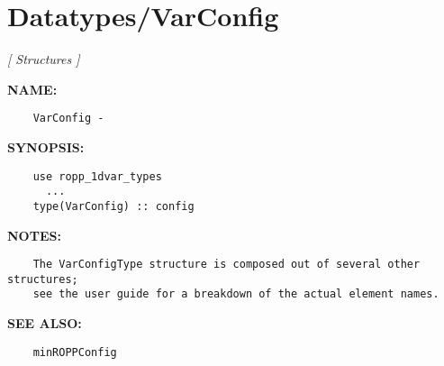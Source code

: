 \section{Datatypes/VarConfig}
\textsl{[ Structures ]}

\label{ch:robo9}
\label{ch:Datatypes_VarConfig}
\textbf{NAME:}\hspace{0.08in}\begin{Verbatim}
    VarConfig - 
\end{Verbatim}
\textbf{SYNOPSIS:}\hspace{0.08in}\begin{Verbatim}
    use ropp_1dvar_types
      ...
    type(VarConfig) :: config
\end{Verbatim}
\textbf{NOTES:}\hspace{0.08in}\begin{Verbatim}
    The VarConfigType structure is composed out of several other structures; 
    see the user guide for a breakdown of the actual element names.
\end{Verbatim}
\textbf{SEE ALSO:}\hspace{0.08in}\begin{Verbatim}
    minROPPConfig
\end{Verbatim}
